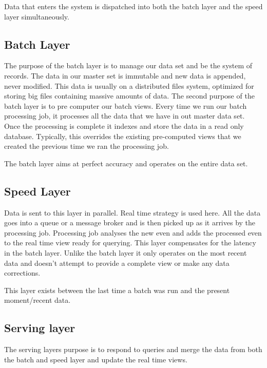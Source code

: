 \begin{note}
    Data that enters the system is dispatched into both the batch layer and the speed layer simultaneously.
\end{note}

\subsection{Batch Layer}

The purpose of the batch layer is to manage our data set and be the system of records.
The data in our master set is immutable and new data is appended, never modified.
This data is usually on a distributed files system, optimized for storing big files containing massive amounts of data.
The second purpose of the batch layer is to pre computer our batch views.
Every time we run our batch processing job, it processes all the data that we have in out master data set.
Once the processing is complete it indexes and store the data in a read only database.
Typically, this overrides the existing pre-computed views that we created the previous time we ran the processing job.

\begin{note}
    The batch layer aims at perfect accuracy and operates on the entire data set.
\end{note}

\subsection{Speed Layer}

Data is sent to this layer in parallel.
Real time strategy is used here.
All the data goes into a queue or a message broker and is then picked up as it arrives by the processing job.
Processing job analyses the new even and adds the processed even to the real time view ready for querying.
This layer compensates for the latency in the batch layer.
Unlike the batch layer it only operates on the most recent data and doesn't attempt to provide a complete view or make any data corrections.

This layer exists between the last time a batch was run and the present moment/recent data.

\subsection{Serving layer}
The serving layers purpose is to respond to queries and merge the data from both the batch and speed layer and update the real time views.

